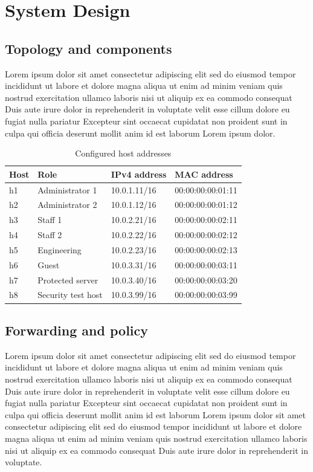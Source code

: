 \section{System Design}

\subsection{Topology and components}
Lorem ipsum dolor sit amet consectetur adipiscing elit sed do eiusmod tempor incididunt ut labore et dolore magna aliqua ut enim ad minim veniam quis nostrud exercitation ullamco laboris nisi ut aliquip ex ea commodo consequat Duis aute irure dolor in reprehenderit in voluptate velit esse cillum dolore eu fugiat nulla pariatur Excepteur sint occaecat cupidatat non proident sunt in culpa qui officia deserunt mollit anim id est laborum Lorem ipsum dolor.



\begin{table}[t]
\caption{Configured host addresses}
\label{tab:hosts}
\centering\small
\begin{tabular}{llll}
\toprule
Host & Role & IPv4 address & MAC address \\
\midrule
h1 & Administrator 1 & 10.0.1.11/16 & 00:00:00:00:01:11 \\
h2 & Administrator 2 & 10.0.1.12/16 & 00:00:00:00:01:12 \\
h3 & Staff 1 & 10.0.2.21/16 & 00:00:00:00:02:11 \\
h4 & Staff 2 & 10.0.2.22/16 & 00:00:00:00:02:12 \\
h5 & Engineering & 10.0.2.23/16 & 00:00:00:00:02:13 \\
h6 & Guest & 10.0.3.31/16 & 00:00:00:00:03:11 \\
h7 & Protected server & 10.0.3.40/16 & 00:00:00:00:03:20 \\
h8 & Security test host & 10.0.3.99/16 & 00:00:00:00:03:99 \\
\bottomrule
\end{tabular}
\end{table}

\subsection{Forwarding and policy}
Lorem ipsum dolor sit amet consectetur adipiscing elit sed do eiusmod tempor incididunt ut labore et dolore magna aliqua ut enim ad minim veniam quis nostrud exercitation ullamco laboris nisi ut aliquip ex ea commodo consequat Duis aute irure dolor in reprehenderit in voluptate velit esse cillum dolore eu fugiat nulla pariatur Excepteur sint occaecat cupidatat non proident sunt in culpa qui officia deserunt mollit anim id est laborum Lorem ipsum dolor sit amet consectetur adipiscing elit sed do eiusmod tempor incididunt ut labore et dolore magna aliqua ut enim ad minim veniam quis nostrud exercitation ullamco laboris nisi ut aliquip ex ea commodo consequat Duis aute irure dolor in reprehenderit in voluptate.

